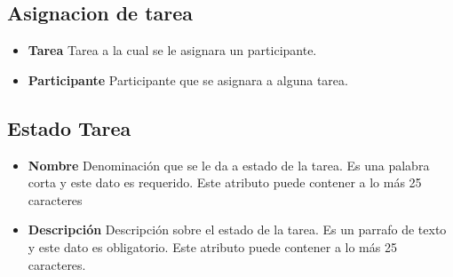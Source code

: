 \subsection{Asignacion de tarea}
\begin{itemize}
	\item \textbf{Tarea} Tarea a la cual se le asignara un participante.
	\item \textbf{Participante} Participante que se asignara a alguna tarea.
\end{itemize}

\subsection{Estado Tarea}
\begin{itemize}
	\item \textbf{Nombre} Denominación que se le da a estado de la tarea. Es una palabra corta y este dato es requerido. Este atributo puede contener a lo más 25 caracteres
	\item \textbf{Descripción} Descripción sobre el estado de la tarea. Es un parrafo de texto y este dato es obligatorio. Este atributo puede contener a lo más 25 caracteres.
\end{itemize}